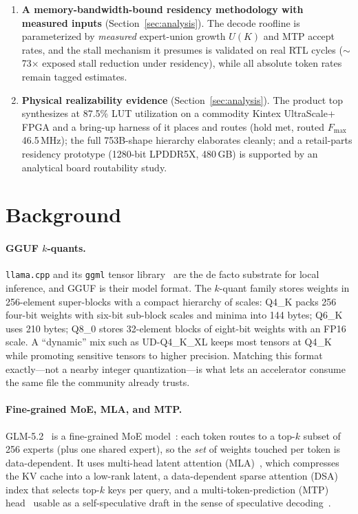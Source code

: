 \documentclass[11pt]{article}
\newcommand{\code}[1]{\texttt{#1}}
\begin{document}
\begin{enumerate}[leftmargin=1.4em,itemsep=2pt]
\item \textbf{A memory-bandwidth-bound residency methodology with measured
inputs} (Section~\ref{sec:analysis}). The decode roofline is parameterized by
\emph{measured} expert-union growth $U(K)$ and MTP accept rates, and the stall
mechanism it presumes is validated on real RTL cycles ($\sim$73$\times$ exposed
stall reduction under residency), while all absolute token rates remain tagged
estimates.

\item \textbf{Physical realizability evidence} (Section~\ref{sec:analysis}).
The product top synthesizes at 87.5\% LUT utilization on a commodity Kintex
UltraScale+ FPGA and a bring-up harness of it places and routes (hold met,
routed $F_{\max}$ 46.5\,MHz); the full 753B-shape hierarchy elaborates cleanly;
and a retail-parts residency prototype (1280-bit LPDDR5X, 480\,GB) is supported
by an analytical board routability study.
\end{enumerate}

\section{Background}

\paragraph{GGUF $k$-quants.} \code{llama.cpp} and its \code{ggml} tensor
library~\cite{llamacpp} are the de facto substrate for local inference, and
GGUF is their model format. The $k$-quant family stores weights in 256-element
super-blocks with a compact hierarchy of scales: Q4\_K packs 256 four-bit
weights with six-bit sub-block scales and minima into 144 bytes; Q6\_K uses 210
bytes; Q8\_0 stores 32-element blocks of eight-bit weights with an FP16 scale.
A ``dynamic'' mix such as UD-Q4\_K\_XL keeps most tensors at Q4\_K while
promoting sensitive tensors to higher precision. Matching this format
exactly---not a nearby integer quantization---is what lets an accelerator
consume the same file the community already trusts.

\paragraph{Fine-grained MoE, MLA, and MTP.} GLM-5.2~\cite{glmweights} is a
fine-grained MoE model~\cite{moe}: each token routes to a top-$k$ subset of 256
experts (plus one shared expert), so the \emph{set} of weights touched per
token is data-dependent. It uses multi-head latent attention
(MLA)~\cite{deepseekv2}, which compresses the KV cache into a low-rank latent,
a data-dependent sparse attention (DSA) index that selects top-$k$ keys per
query, and a multi-token-prediction (MTP) head~\cite{deepseekv3} usable as a
self-speculative draft in the sense of speculative
decoding~\cite{specdec,chen2023spec}.
\end{document}
